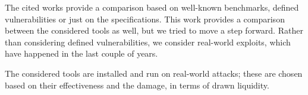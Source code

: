 The cited works provide a comparison based on well-known benchmarks, defined vulnerabilities or just on the specifications.
This work provides a comparison between the considered tools as well, 
but we tried to move a step forward.
Rather than considering defined vulnerabilities, we consider real-world exploits, which have happened in the last couple of years.

The considered tools are installed and run on real-world attacks; these are chosen based on their effectiveness and the damage, in terms of drawn liquidity.